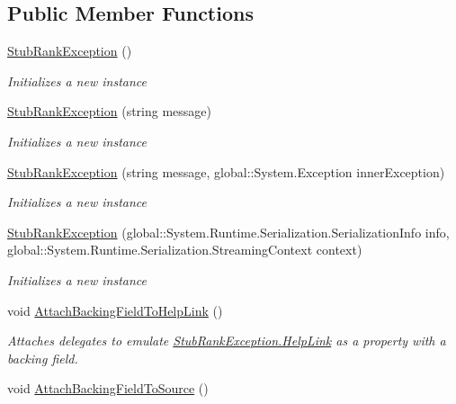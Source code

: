 \subsection*{Public Member Functions}
\begin{DoxyCompactItemize}
\item 
\hyperlink{class_system_1_1_fakes_1_1_stub_rank_exception_ae09b87b2c1e7edf15d725e99d7641cc9}{Stub\-Rank\-Exception} ()
\begin{DoxyCompactList}\small\item\em Initializes a new instance\end{DoxyCompactList}\item 
\hyperlink{class_system_1_1_fakes_1_1_stub_rank_exception_ad07b92aa126c1ae9075a95260a4e2f84}{Stub\-Rank\-Exception} (string message)
\begin{DoxyCompactList}\small\item\em Initializes a new instance\end{DoxyCompactList}\item 
\hyperlink{class_system_1_1_fakes_1_1_stub_rank_exception_a66567e1a3b9931114572cf6b05e11da6}{Stub\-Rank\-Exception} (string message, global\-::\-System.\-Exception inner\-Exception)
\begin{DoxyCompactList}\small\item\em Initializes a new instance\end{DoxyCompactList}\item 
\hyperlink{class_system_1_1_fakes_1_1_stub_rank_exception_af9e8809ef31552aeb870b69fdf737b51}{Stub\-Rank\-Exception} (global\-::\-System.\-Runtime.\-Serialization.\-Serialization\-Info info, global\-::\-System.\-Runtime.\-Serialization.\-Streaming\-Context context)
\begin{DoxyCompactList}\small\item\em Initializes a new instance\end{DoxyCompactList}\item 
void \hyperlink{class_system_1_1_fakes_1_1_stub_rank_exception_a0524b0e072af7a602e101936bc5a8cae}{Attach\-Backing\-Field\-To\-Help\-Link} ()
\begin{DoxyCompactList}\small\item\em Attaches delegates to emulate \hyperlink{class_system_1_1_fakes_1_1_stub_rank_exception_a43beefb187025e122e8cc62baab6f798}{Stub\-Rank\-Exception.\-Help\-Link} as a property with a backing field.\end{DoxyCompactList}\item 
void \hyperlink{class_system_1_1_fakes_1_1_stub_rank_exception_ad857e8dacb26de045ba0316d7bbb95a0}{Attach\-Backing\-Field\-To\-Source} ()

\end{DoxyCompactItemize}
